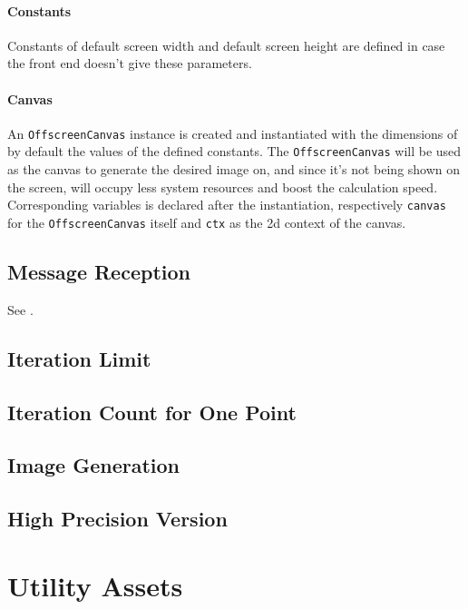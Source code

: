 \paragraph{Constants} Constants of default screen width and default screen height are defined in case the front end doesn't give these parameters.

\paragraph{Canvas} An \texttt{OffscreenCanvas} instance is created and instantiated with the dimensions of by default the values of the defined constants. The \texttt{OffscreenCanvas} will be used as the canvas to generate the desired image on, and since it's not being shown on the screen, will occupy less system resources and boost the calculation speed. Corresponding variables is declared after the instantiation, respectively \texttt{canvas} for the \texttt{OffscreenCanvas} itself and \texttt{ctx} as the 2d context of the canvas.

\subsection{Message Reception}

See .

\subsection{Iteration Limit}

\subsection{Iteration Count for One Point}

\subsection{Image Generation}

\subsection{High Precision Version}


\section{Utility Assets}

